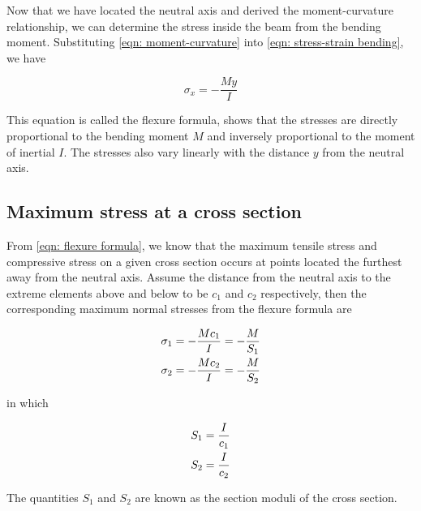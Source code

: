 \documentclass[
10pt,
a4paper,
openany,
svgnames,
]{book} %
\begin{document}
Now that we have located the neutral axis and derived the moment-curvature relationship, we can determine the stress inside the beam from the bending moment. Substituting \cref{eqn: moment-curvature} into \cref{eqn: stress-strain bending}, we have

\begin{equation} \label{eqn: flexure formula}
  {\sigma _x} =  - \frac{{My}}{I}
\end{equation}

This equation is called the flexure formula, shows that the stresses are directly proportional to the bending moment $M$ and inversely proportional to the moment of inertial $I$. The stresses also vary linearly with the distance $y$ from the neutral axis.

\subsection{Maximum stress at a cross section}

From \cref{eqn: flexure formula}, we know that the maximum tensile stress and compressive stress on a given cross section occurs at points located the furthest away from the neutral axis. Assume the distance from the neutral axis to the extreme elements above and below to be $c_1$ and $c_2$ respectively, then the corresponding maximum normal stresses from the flexure formula are

\begin{equation} \label{eqn: section modulus}
  \begin{gathered}
    \sigma _1 =  - \frac{Mc_1}{I} =  - \frac{M}{S_1} \hfill \\
    \sigma _2 =  - \frac{Mc_2}{I} =  - \frac{M}{S_2} \hfill \\ 
  \end{gathered}
\end{equation}

in which

\[\begin{gathered}
  S_1 = \frac{I}{c_1} \hfill \\
  S_2 = \frac{I}{c_2} \hfill \\ 
\end{gathered} \]

The quantities $S_1$ and $S_2$ are known as the section moduli of the cross section.
\end{document}
